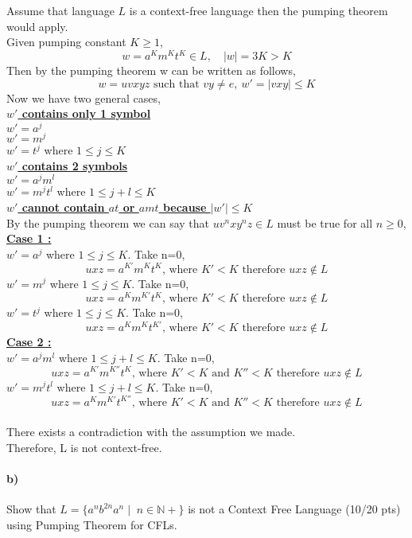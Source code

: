 \documentclass[a4paper,12pt]{article}
\begin{document}
\begin{tcolorbox}
Assume that language $L$ is a context-free language then the pumping theorem would apply. \\
Given pumping constant $K\geq1$,
$$w=a^Km^{K}t^K\in L,\quad |w|=3K>K$$
Then by the pumping theorem w can be written as follows,
$$w=uvxyz \text{ such that } vy\neq e,\ w'=|vxy|\leq K$$
Now we have two general cases, \\
\textbf{\underline{$w'$ contains only 1 symbol}} \\
$w'=a^j$ \\
$w'=m^j$ \\
$w'=t^j$ 
where $1\leq j\leq K$ \\
\textbf{\underline{$w'$ contains 2 symbols}} \\
$w'=a^jm^l$ \\
$w'=m^jt^l$ where $1\leq j+l \leq K$ \\
\textbf{\underline{$w'$ cannot contain $at$ or $amt$ because $|w'|\leq K$}} \\ 
By the pumping theorem we can say that $uv^nxy^nz\in L$ must be true for all $n\geq 0$, \\
\textbf{\underline{Case 1 :}} \\
$w'=a^j$ where $1\leq j\leq K$. Take n=0, 
$$uxz=a^{K'}m^{K}t^{K}   \text{, where }  K'<K \text{ therefore } uxz\notin L$$
$w'=m^j$ where $1\leq j\leq K$. Take n=0, 
$$uxz=a^{K}m^{K'}t^{K}  \text{, where } K'<K \text{ therefore } uxz\notin L$$
$w'=t^j$ where $1\leq j\leq K$. Take n=0, 
$$uxz=a^{K}m^{K}t^{K'}  \text{, where } K'<K \text{ therefore } uxz\notin L$$
\textbf{\underline{Case 2 :}} \\
$w'=a^jm^l$ where $1\leq j+l\leq K$. Take n=0, 
$$uxz=a^{K'}m^{K''}t^{K}  \text{, where } K'<K \text{ and } K''<K \text{ therefore } uxz\notin L$$
$w'=m^jt^l$ where $1\leq j+l\leq K$. Take n=0, 
$$uxz=a^{K}m^{K'}t^{K''} \text{, where } K'<K \text{ and } K''<K \text{ therefore } uxz\notin L$$ \\
There exists a contradiction with the assumption we made. \\
Therefore, L is not context-free.
\end{tcolorbox}


\paragraph{b)} Show that $L=\{a^n b^{2n} a^n \mid \; n \in \mathbb{N+} \}$ is not a Context Free Language \hfill \small{(10/20 pts)} \\
using Pumping Theorem for CFLs. \\
\end{document}
